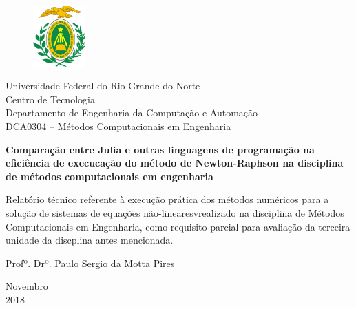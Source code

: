 \documentclass[a4paper, 12pt, openright, oneside]{article}
\begin{document}
\begin{titlepage}
	\begin{center}
	
	\begin{figure}[!ht]
	\centering
	\includegraphics[width=2cm]{./ufrn.jpg}
	\end{figure}

		Universidade Federal do Rio Grande do Norte\\
		Centro de Tecnologia\\
		Departamento de Engenharia da Computação e Automação\\
		DCA0304 -- Métodos Computacionais em Engenharia\\
\vspace{15pt}
        
        \vspace{85pt}
        
		\textbf{\large{Comparação entre Julia e outras linguagens de programação na eficiência de execucação do método de Newton-Raphson na disciplina de métodos computacionais em engenharia}}\\
			
	\end{center}
\vspace{1,5cm}
	
	\begin{flushright}

   \begin{list}{}{
      \setlength{\leftmargin}{4.5cm}
      \setlength{\rightmargin}{0cm}
      \setlength{\labelwidth}{0pt}
      \setlength{\labelsep}{\leftmargin}}

      \item Relatório técnico referente à execução prática dos métodos numéricos para a solução de sistemas de equações não-linearesvrealizado na disciplina de Métodos Computacionais em Engenharia, como requisito parcial para avaliação da terceira unidade da discplina antes mencionada.

      \begin{list}{}{
      \setlength{\leftmargin}{0cm}
      \setlength{\rightmargin}{0cm}
      \setlength{\labelwidth}{0pt}
      \setlength{\labelsep}{\leftmargin}}


            \item Profº. Drº. Paulo Sergio da Motta Pires

      \end{list}
   \end{list}
\end{flushright}
\vspace{1cm}
\begin{center}
		\vspace{\fill}
		 Novembro\\2018
			\end{center}
\end{titlepage}
\end{document}
